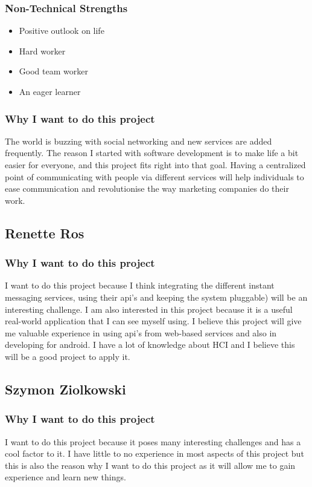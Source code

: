 \subsubsection{Non-Technical Strengths}
\begin{itemize}
	\item{Positive outlook on life}
	\item{Hard worker}
	\item{Good team worker}
	\item{An eager learner}
\end{itemize}
\subsubsection{Why I want to do this project}
The world is buzzing with social networking and new services are added frequently. The reason I started with software development is to make life a bit easier for everyone, and this project fits right into that goal. Having a centralized point of communicating with people via different services will help individuals to ease communication and revolutionise the way marketing companies do their work.

\pagebreak
\subsection{Renette Ros}

\subsubsection{Why I want to do this project} 
I want to do this project because I think integrating the different instant messaging services, using their api's and keeping the system pluggable) will be an interesting challenge.  I am also interested in this project because it is a useful real-world application that I can see myself using. I believe this project will give me valuable experience in using api's from web-based services and also in developing for android. I have a lot of knowledge about HCI and I believe this will be a good project to apply it.
 
\pagebreak
\subsection{Szymon Ziolkowski}

\subsubsection{Why I want to do this project} 
I want to do this project because it poses many interesting challenges and has a cool factor to it. I have little to no experience in most aspects of this project but this is also the reason why I want to do this project as it will allow me to gain experience and learn new things. 

